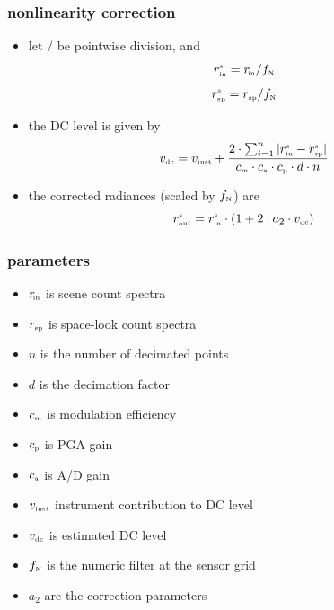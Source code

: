 \documentclass[11pt]{beamer}
\begin{document}
{ %
\newcommand {\rsp}   {r_{\mbox{\tiny sp}}}
\newcommand {\rins}  {r_{\mbox{\tiny in}}^{\mbox{\tiny s}}}
\newcommand {\rsps}  {r_{\mbox{\tiny sp}}^{\mbox{\tiny s}}}
\newcommand {\routs} {r_{\mbox{\tiny out}}^{\mbox{\tiny s}}}
\newcommand {\cm}    {c_{\mbox{\tiny m}}}
\newcommand {\cp}    {c_{\mbox{\tiny p}}}
\newcommand {\ca}    {c_{\mbox{\tiny a}}}
\newcommand {\vinst} {v_{\mbox{\tiny inst}}}
\newcommand {\vdc}   {v_{\mbox{\tiny dc}}}
\newcommand {\fn}    {f_{\mbox{\tiny N}}}
\newcommand {\fnm}   {f_{\mbox{\tiny NM}}}

\begin{frame}
\frametitle{nonlinearity correction}

\begin{itemize}
 
 \item let $/$ be pointwise division, and
     \[\rins = \rin / \fn\]
     \[\rsps = \rsp / \fn\]

  \item the DC level is given by
    \[\vdc = \vinst + 
      \frac{2\cdot \sum_{i=1}^n|{\rins} - {\rsps}|} 
           {\cm \cdot \ca \cdot \cp \cdot d\cdot n}\]

  \item the corrected radiances (scaled by $\fn$) are
    \[\routs = \rins \cdot (1 + 2\cdot a_2 \cdot \vdc)\]

\end{itemize}

\end{frame}
\begin{frame}
\frametitle{parameters}

\begin{itemize}
  \item $r_{\!\mbox{\tiny in}}$ is scene count spectra
  \item $\rsp$ is space-look count spectra
  \item $n$ is the number of decimated points
  \item $d$ is the decimation factor
  \item $\cm$ is modulation efficiency
  \item $\cp$ is PGA gain 
  \item $\ca$ is A/D gain
  \item $\vinst$ instrument contribution to DC level
  \item $\vdc$ is estimated DC level
  \item $\fn$ is the numeric filter at the sensor grid
  \item $a_2$ are the correction parameters
\end{itemize}

\end{frame}
} %
\end{document}
